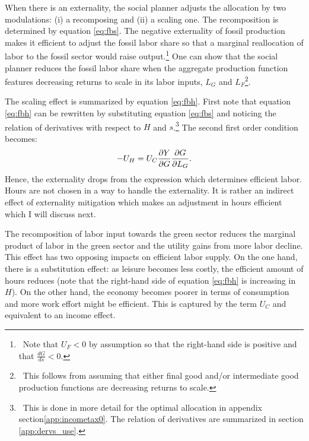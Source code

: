 When there is an externality, the social planner adjusts the allocation by two modulations: (i) a recomposing and (ii) a scaling one. 
The recomposition is determined by equation \ref{eq:fbs}.
The negative externality of fossil production makes it efficient to adjust the fossil labor share so that  a marginal reallocation of labor to the fossil sector would raise output.\footnote{\ Note that $U_F<0$ by assumption so that the right-hand side is positive and that $\frac{dG}{ds}<0$. }
One can show that the social planner reduces the fossil labor share when the aggregate production function features decreasing returns to scale in its labor inputs, $L_G$ and $L_F$\footnote{\ This follows from assuming that either final good and/or intermediate good production functions are decreasing returns to scale.}.
\begin{comment}
The equation 
\begin{align}
\frac{-U_F}{U_C \frac{dY}{dF}}=1+\frac{\frac{dY}{dG}\frac{dG}{ds}}{\frac{dY}{dF}\frac{dF}{ds}}.
\end{align}
The term on the left-hand side is the social cost of the externality: it measures what the representative household is willing to pay for a further reduction in fossil production. 
\end{comment}

The scaling effect is summarized by equation \ref{eq:fbh}.
First note that equation \ref{eq:fbh} can be rewritten by substituting equation \ref{eq:fbs} and noticing the relation of derivatives with respect to $H$ and $s$.\footnote{\ This is done in more detail for the optimal allocation in appendix section\ref{app:incometax0}. The relation of derivatives are summarized in section \ref{app:dervs_use}.}  
The second first order condition becomes:
\begin{align}\label{eq:fbh_simp}
-U_H=U_C\frac{\partial Y}{\partial G}\frac{\partial{G}}{\partial{L_G}}.
\end{align}
Hence, the externality drops from the expression which determines efficient labor. Hours are not chosen in a way to handle the externality. It is rather an indirect effect of externality mitigation which makes an adjustment in hours efficient which I will discuss next.

The recomposition of labor input towards the  green sector reduces the marginal product of labor in the green sector and the utility gains from more labor decline.  This effect has two opposing impacts on efficient labor supply. On the one hand, there is a substitution effect: as leisure becomes less costly, the efficient amount of hours reduces (note that the right-hand side of equation \ref{eq:fbh} is increasing in $H$). On the other hand, the economy becomes poorer in terms of consumption and more work effort might be efficient. This is captured by the term $U_C$ and equivalent to an income effect. 

